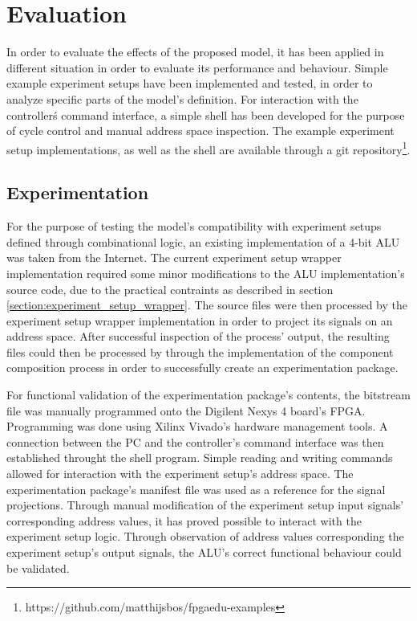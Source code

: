 \documentclass[main.tex]{subfiles}
\begin{document}
\chapter{Evaluation}

In order to evaluate the effects of the proposed model, it has been applied in different situation in order to evaluate its performance and behaviour. Simple example experiment setups have been implemented and tested, in order to analyze specific parts of the model's definition. For interaction with the controllerś command interface, a simple shell has been developed for the purpose of cycle control and manual address space inspection. The example experiment setup implementations, as well as the shell are available through a git repository\footnote{https://github.com/matthijsbos/fpgaedu-examples}. 

\section{Experimentation}
For the purpose of testing the model's compatibility with experiment setups defined through combinational logic, an existing implementation of a 4-bit ALU was taken from the Internet. The current experiment setup wrapper implementation required some minor modifications to the ALU implementation's source code, due to the practical contraints as described in section \ref{section:experiment_setup_wrapper}. The source files were then processed by the experiment setup wrapper implementation in order to project its signals on an address space. After successful inspection of the process' output, the resulting files could then be processed by through the implementation of the component composition process in order to successfully create an experimentation package. 

For functional validation of the experimentation package's contents, the bitstream file was manually programmed onto the Digilent Nexys 4 board's FPGA. Programming was done using Xilinx Vivado's hardware management tools. A connection between the PC and the controller's command interface was then established throught the shell program. Simple reading and writing commands allowed for interaction with the experiment setup's address space. The experimentation package's manifest file was used as a reference for the signal projections. Through manual modification of the experiment setup input signals' corresponding address values, it has proved possible to interact with the experiment setup logic. Through observation of address values corresponding the experiment setup's output signals, the ALU's correct functional behaviour could be validated. 
\end{document}
